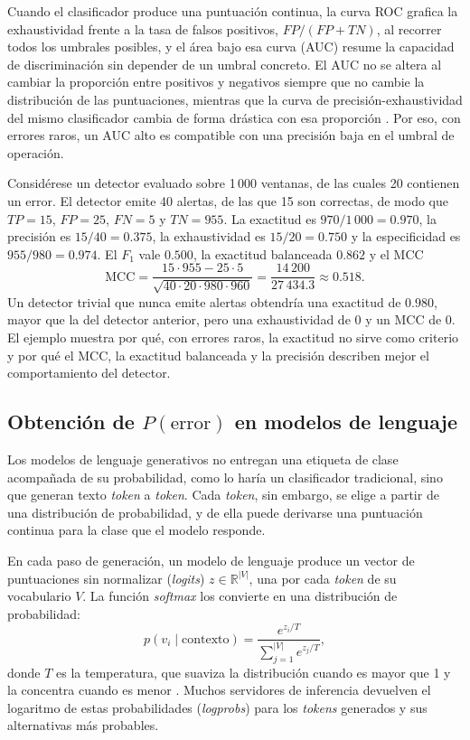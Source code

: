 Cuando el clasificador produce una puntuación continua, la curva ROC grafica la exhaustividad frente a la tasa de falsos positivos, $FP/(FP + TN)$, al recorrer todos los umbrales posibles, y el área bajo esa curva (AUC) resume la capacidad de discriminación sin depender de un umbral concreto. El AUC no se altera al cambiar la proporción entre positivos y negativos siempre que no cambie la distribución de las puntuaciones, mientras que la curva de precisión-exhaustividad del mismo clasificador cambia de forma drástica con esa proporción \cite{richardson2024_roc}. Por eso, con errores raros, un AUC alto es compatible con una precisión baja en el umbral de operación.

Considérese un detector evaluado sobre 1\,000 ventanas, de las cuales 20 contienen un error. El detector emite 40 alertas, de las que 15 son correctas, de modo que $TP = 15$, $FP = 25$, $FN = 5$ y $TN = 955$. La exactitud es $970/1\,000 = 0.970$, la precisión es $15/40 = 0.375$, la exhaustividad es $15/20 = 0.750$ y la especificidad es $955/980 = 0.974$. El $F_1$ vale $0.500$, la exactitud balanceada $0.862$ y el MCC
\begin{equation}
\mathrm{MCC} = \frac{15 \cdot 955 - 25 \cdot 5}{\sqrt{40 \cdot 20 \cdot 980 \cdot 960}} = \frac{14\,200}{27\,434.3} \approx 0.518.
\end{equation}
Un detector trivial que nunca emite alertas obtendría una exactitud de $0.980$, mayor que la del detector anterior, pero una exhaustividad de 0 y un MCC de 0. El ejemplo muestra por qué, con errores raros, la exactitud no sirve como criterio y por qué el MCC, la exactitud balanceada y la precisión describen mejor el comportamiento del detector.

\subsection{Obtención de $P(\text{error})$ en modelos de lenguaje}\label{sec:mt_probabilidad}

Los modelos de lenguaje generativos no entregan una etiqueta de clase acompañada de su probabilidad, como lo haría un clasificador tradicional, sino que generan texto \textit{token} a \textit{token}. Cada \textit{token}, sin embargo, se elige a partir de una distribución de probabilidad, y de ella puede derivarse una puntuación continua para la clase que el modelo responde.

En cada paso de generación, un modelo de lenguaje produce un vector de puntuaciones sin normalizar (\textit{logits}) $z \in \mathbb{R}^{|V|}$, una por cada \textit{token} de su vocabulario $V$. La función \textit{softmax} los convierte en una distribución de probabilidad:
\begin{equation}
p(v_i \mid \text{contexto}) = \frac{e^{z_i / T}}{\sum_{j=1}^{|V|} e^{z_j / T}},
\end{equation}
donde $T$ es la temperatura, que suaviza la distribución cuando es mayor que 1 y la concentra cuando es menor \cite{yang2025_lightweight}. Muchos servidores de inferencia devuelven el logaritmo de estas probabilidades (\textit{logprobs}) para los \textit{tokens} generados y sus alternativas más probables.

